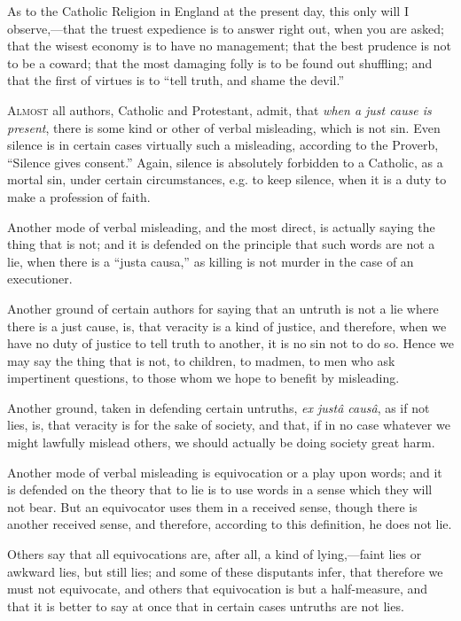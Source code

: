 As to the Catholic Religion in England at the present day, this only
will I observe,—that the truest expedience is to answer right out,
when you are asked; that the wisest economy is to have no management;
that the best prudence is not to be a coward; that the most damaging
folly is to be found out shuffling; and that the first of virtues is to
``tell truth, and shame the devil.''


A\textsc{lmost} all authors, Catholic and Protestant, admit, that \emph{when a
just cause is present}, there is some kind or other of verbal
misleading, which is not sin. Even silence is in certain cases virtually
such a misleading, according to the Proverb, ``Silence gives
consent.'' Again, silence is absolutely forbidden to a Catholic, as
a mortal sin, under certain circumstances, e.g. to keep silence, when it
is a duty to make a profession of faith.

Another mode of verbal misleading, and the most direct, is actually
saying the thing that is not; and it is defended on the principle that
such words are not a lie, when there is a ``justa causa,'' as
killing is not murder in the case of an executioner.

Another ground of certain authors for saying that an untruth is not a
lie where there is a just cause, is, that veracity is a kind of justice,
and therefore, when we have no duty of justice to tell truth to another,
it is no sin not to do so. Hence we may say the thing that is not, to
children, to madmen, to men who ask impertinent questions, to
those whom we hope to benefit by misleading.

Another ground, taken in defending certain untruths, \emph{ex justâ
causâ}, as if not lies, is, that veracity is for the sake of society,
and that, if in no case whatever we might lawfully
mislead others, we should actually be doing society great harm.

Another mode of verbal misleading is equivocation or a play upon
words; and it is defended on the theory that to lie is to use
words in a sense which they will not bear. But an equivocator uses them
in a received sense, though there is another received sense, and
therefore, according to this definition, he does not lie.

Others say that all equivocations are, after all, a kind of
lying,—faint lies or awkward lies, but still lies; and some
of these disputants infer, that therefore we must not equivocate, and
others that equivocation is but a half-measure, and that it is better to
say at once that in certain cases untruths are not lies.

